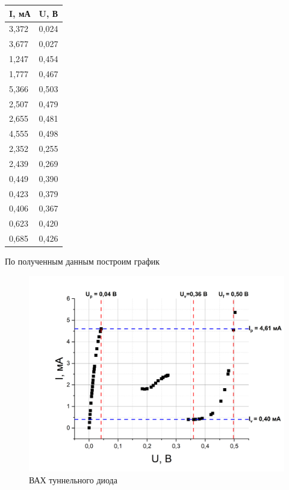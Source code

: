 \documentclass[a4paper,12pt]{article}
\begin{document}
\begin{minipage}[c]{0.33\linewidth}
\begin{tabular}{|l|l|}
\hline
I, мА & U, В \\ \hline
3,372 & 0,024 \\ \hline
3,677 & 0,027 \\ \hline
1,247 & 0,454 \\ \hline
1,777 & 0,467 \\ \hline
5,366 & 0,503 \\ \hline
2,507 & 0,479 \\ \hline
2,655 & 0,481 \\ \hline
4,555 & 0,498 \\ \hline
2,352 & 0,255 \\ \hline
2,439 & 0,269 \\ \hline
0,449 & 0,390 \\ \hline
0,423 & 0,379 \\ \hline
0,406 & 0,367 \\ \hline
0,623 & 0,420 \\ \hline
0,685 & 0,426 \\ \hline
\end{tabular}
\end{minipage}

\newpage

По полученным данным построим график 

\begin{figure}[h!]
	\centering
	\includegraphics[width=\linewidth]{UI-characteristic}
	\caption{ВАХ туннельного диода}
\end{figure}
\end{document}
